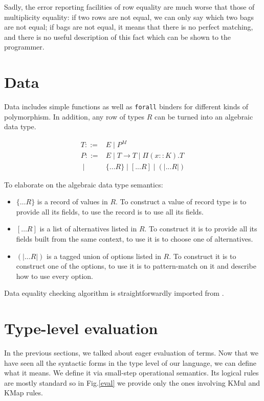 \documentclass[a4paper,14pt]{extreport}
\begin{document}
Sadly, the error reporting facilities of row equality are much worse that those
of multiplicity equality: if two rows are not equal, we can only say which two
bags are not equal; if bags are not equal, it means that there is no perfect
matching, and there is no useful description of this fact which can be shown to
the programmer.

\section{Data}

Data includes simple functions as well as \verb|forall| binders for different
kinds of polymorphism. In addition, any row of types $R$ can be turned into an
algebraic data type.

\[
    \begin{array}{rl}
        T ::=& E \;|\; P^M \\
        P ::=& E \;|\; T \to T \;|\; \Pi (x :: K). T \\
        \;|\;& \{...R\} \;|\; [...R] \;|\; (|...R|)
    \end{array}
\]

To elaborate on the algebraic data type semantics:

\begin{itemize}
    \item $\{\dots R\}$ is a record of values in $R$. To construct a value of
        record type is to provide all its fields, to use the record is to use
        all its fields.
    \item $[\dots R]$ is a list of alternatives listed in $R$. To construct it
        is to provide all its fields built from the same context, to use it is
        to choose one of alternatives.
    \item $(|\dots R|)$ is a tagged union of options listed in $R$. To construct
        it is to construct one of the options, to use it is to pattern-match on
        it and describe how to use every option.
\end{itemize}

Data equality checking algorithm is straightforwardly imported from
\cite{stone}.

\newpage

\section{Type-level evaluation}

In the previous sections, we talked about eager evaluation of terms. Now that we
have seen all the syntactic forms in the type level of our language, we can
define what it means. We define it via small-step operational semantics. Its
logical rules are mostly standard so in Fig.\ref{eval} we provide only the ones
involving KMul and KMap rules.
\end{document}
